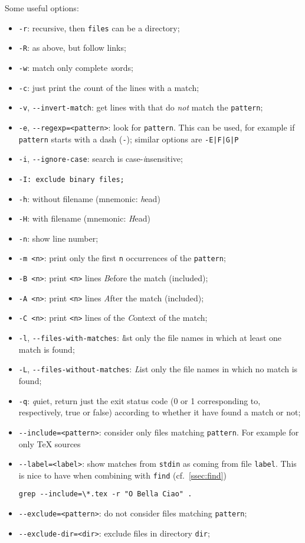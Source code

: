 \documentclass[a4paper,12pt,%
              final%
              ]{article}
\begin{document}
Some useful options:
\begin{itemize}
  \item \texttt{-r}: recursive, then \texttt{files} can be a directory;
  \item \texttt{-R}: as above, but follow links;
  \item \texttt{-w}: match only complete \emph{w}ords;
  \item \texttt{-c}: just print the \emph{c}ount of the lines with a match;
  \item \texttt{-v}, \verb|--invert-match|: get lines with that do \emph{not} match the \texttt{pattern};
  \item \texttt{-e}, \verb|--regexp=<pattern>|: look for \texttt{pattern}. This can be used, for example if \texttt{pattern} starts with a dash (\texttt{-}); similar options are \verb!-E|F|G|P!
  \item \texttt{-i}, \verb|--ignore-case|: search is case-\emph{i}nsensitive;
  \item \texttt{-I: exclude binary files;}
  \item \texttt{-h}: without filename (mnemonic: \emph{h}ead)
  \item \texttt{-H}: with filename (mnemonic: \emph{H}ead)
  \item \texttt{-n}: show line number;
  \item \texttt{-m <n>}: print only the first \texttt{n} occurrences of the \texttt{pattern};
  \item \texttt{-B <n>}: print \texttt{<n>} lines \emph{B}efore the match (included);
  \item \texttt{-A <n>}: print \texttt{<n>} lines \emph{A}fter the match (included);
  \item \texttt{-C <n>}: print \texttt{<n>} lines of the \emph{C}ontext of the match;
  \item \texttt{-l}, \verb|--files-with-matches|: \emph{l}ist only the file names in which at least one match is found;
  \item \texttt{-L}, \verb|--files-without-matches|: \emph{L}ist only the file names in which no match is found;
  \item \texttt{-q}: \emph{q}uiet, return just the exit status code (0 or 1 corresponding to, respectively, true or false) according to whether it have found a match or not;
  \item \verb|--include=<pattern>|: consider only files matching \texttt{pattern}. For example for only \TeX{} sources
  \item \verb|--label=<label>|: show matches from \texttt{stdin} as coming from file \texttt{label}. This is nice to have when combining with \texttt{find} (cf.~\autoref{ssec:find})
\begin{verbatim}
grep --include=\*.tex -r "O Bella Ciao" .
\end{verbatim}
  \item \verb|--exclude=<pattern>|: do not consider files matching \texttt{pattern};
  \item \verb|--exclude-dir=<dir>|: exclude files in directory \texttt{dir};
\end{itemize}
\end{document}
